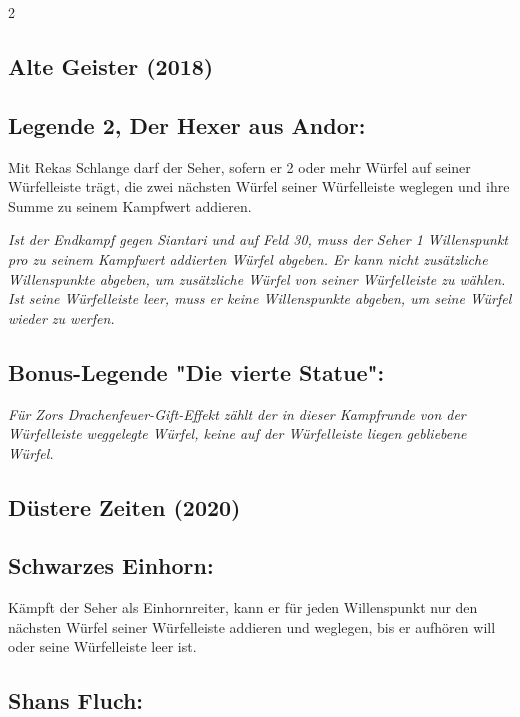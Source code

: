 \documentclass[10pt, a4paper, oneside]{book}
\newcommand{\fan}[1]{\textit{#1}}
\begin{document}
\begin{multicols*}{2}
\begin{bgcolor}[color-AG]
\section{Alte Geister (2018)}



\subsection{Legende 2, Der Hexer aus Andor:}

Mit Rekas Schlange darf der Seher, sofern er 2 oder mehr Würfel auf seiner Würfelleiste trägt, die zwei nächsten Würfel seiner Würfelleiste weglegen und ihre Summe zu seinem Kampfwert addieren.
\supercite{AG:Begleitheft}

\fan{Ist der Endkampf gegen Siantari und auf Feld 30, muss der Seher 1 Willenspunkt pro zu seinem Kampfwert addierten Würfel abgeben. Er kann nicht zusätzliche Willenspunkte abgeben, um zusätzliche Würfel von seiner Würfelleiste zu wählen. Ist seine Würfelleiste leer, muss er keine Willenspunkte abgeben, um seine Würfel wieder zu werfen.}

\subsection{Bonus-Legende "Die vierte Statue":}

\fan{Für Zors Drachenfeuer-Gift-Effekt zählt der in dieser Kampfrunde von der Würfelleiste weggelegte Würfel, keine auf der Würfelleiste liegen gebliebene Würfel.}


\end{bgcolor}



\begin{bgcolor}[color-DZ]
\section{Düstere Zeiten (2020)}


\subsection{Schwarzes Einhorn:}

Kämpft der Seher als Einhornreiter, kann er für jeden Willenspunkt nur den nächsten Würfel seiner Würfelleiste addieren und weglegen, bis er aufhören will oder seine Würfelleiste leer ist.
\supercite{DZ:Begleitheft}



\subsection{Shans Fluch:}


\end{bgcolor}
\end{multicols*}
\end{document}
